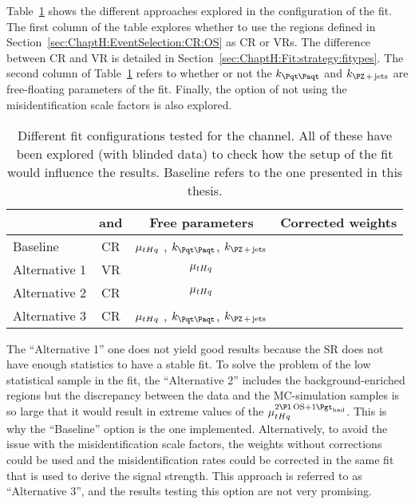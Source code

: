 Table~\ref{tab:tHq:FitConfiguration:OS} shows the different approaches explored in the configuration
of the \dilepOStau fit. The first column of the table explores whether to use the regions 
defined in Section~\ref{sec:ChaptH:EventSelection:CR:OS} as CR or VRs. 
The difference between CR and VR is detailed in Section~\ref{sec:ChaptH:Fit:strategy:fitypes}.
The second column of Table~\ref{tab:tHq:FitConfiguration:OS} refers to whether or not
the $k_{\ttbar}$ and $k_{\Zjets}$ are free-floating parameters of the fit. Finally, the option
of not using the misidentification scale factors is also explored.

\begin{table}[h]
\centering
\begin{tabular}{l|c|c|c}
\toprule
              		& \ttbar and \Zjets 	& Free parameters 					& Corrected weights \\
 \midrule
Baseline     	& CR                   	& $\mu_{tHq}$ , $k_{\ttbar}$, $k_{\Zjets}$	& \checkmark               \\
Alternative 1	& VR                  	& $\mu_{tHq}$              				& \checkmark               \\
Alternative 2 	& CR                  	& $\mu_{tHq}$               				& \checkmark               \\
Alternative 3 	& CR                  	& $\mu_{tHq}$ , $k_{\ttbar}$, $k_{\Zjets}$	& \xmark              	   \\ 
\bottomrule
\end{tabular}
\caption{Different fit configurations tested for the \dilepOStau channel. All of these have
been explored (with blinded data) to check how the setup of the fit would influence the results. 
Baseline refers to the one presented in this thesis.}
\label{tab:tHq:FitConfiguration:OS}
\end{table}

The ``Alternative 1'' one does not yield good results because the SR does not have enough statistics
to have a stable fit. To solve the problem of the low statistical sample in the fit, the ``Alternative 2'' includes the background-enriched
regions but the discrepancy between the data and the MC-simulation samples is so large
that it would result in extreme values of the $\mu_{\tHq}^{\dilepOStau}$. This is why the
``Baseline'' option is the one implemented. Alternatively, to avoid the issue with the 
misidentification scale factors, the weights without corrections could be used and
the misidentification rates could be corrected in the same fit that is used to
derive the signal strength. This approach is referred to as ``Alternative 3'', and the results
testing this option are not very promising.


